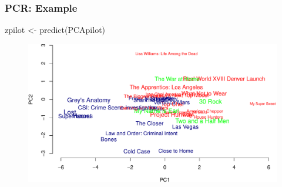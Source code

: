 \documentclass[
  shownotes,
  xcolor={svgnames},
  hyperref={colorlinks,citecolor=DarkBlue,linkcolor=DarkRed,urlcolor=DarkBlue}
  , aspectratio=169]{beamer}
\newenvironment{Shaded}{\begin{snugshade}}{\end{snugshade}}
\newcommand{\FunctionTok}[1]{\textcolor[rgb]{0.00,0.00,0.00}{#1}}
\newcommand{\NormalTok}[1]{#1}
\newcommand{\OtherTok}[1]{\textcolor[rgb]{0.56,0.35,0.01}{#1}}
\begin{document}
\begin{frame}[fragile]
\frametitle{PCR: Example }

\begin{scriptsize}

  \begin{Shaded}
  \begin{Highlighting}[]
  \NormalTok{zpilot }\OtherTok{\textless{}{-}} \FunctionTok{predict}\NormalTok{(PCApilot)}

  \end{Highlighting}
  \end{Shaded}
\end{scriptsize}

  \begin{figure}[H] \centering
            \captionsetup{justification=centering}
              \includegraphics[scale=.5]{figures/unnamed-chunk-5-1.pdf}
 \end{figure}




\end{frame}
\end{document}
